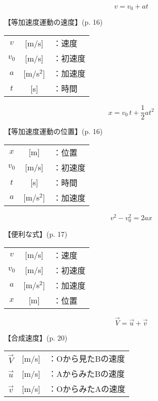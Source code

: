 \documentclass[10pt]{jarticle}
\begin{document}
\newpage
\[
	v = v_0 + a t
\]


\vskip3mm
【等加速度運動の速度】{\footnotesize (p. 16)}

\begin{tabular}{ccl}
$v$	&[m/s]	&：速度\\
$v_0$	&[m/s]	&：初速度\\
$a$	&[m/s$^2$]	&：加速度\\
$t$	&[s]	&：時間
\end{tabular}




\newpage
\[
	x = v_0\, t + \frac{1}{2} a t^2
\]


\vskip3mm
【等加速度運動の位置】{\footnotesize (p. 16)}

\begin{tabular}{ccl}
$x$	&[m]	&：位置\\
$v_0$	&[m/s]	&：初速度\\
$t$	&[s]	&：時間\\
$a$	&[m/s$^2$]	&：加速度
\end{tabular}





\newpage
\[
	v^2 - v_0^2 = 2 a x
\]


\vskip3mm
【便利な式】{\footnotesize (p. 17)}

\begin{tabular}{ccl}
$v$	&[m/s]	&：速度\\
$v_0$	&[m/s]	&：初速度\\
$a$	&[m/s$^2$]	&：加速度\\
$x$	&[m]	&：位置
\end{tabular}






\newpage
\[
	\vec{V} = \vec{u} + \vec{v}
\]


\vskip3mm
【合成速度】{\footnotesize (p. 20)}

\begin{tabular}{ccl}
$\vec{V}$	&[m/s]	&\small ：Oから見たBの速度\\
$\vec{u}$	&[m/s]	&\small ：AからみたBの速度\\
$\vec{v}$	&[m/s]	&\small ：OからみたAの速度
\end{tabular}
\end{document}
